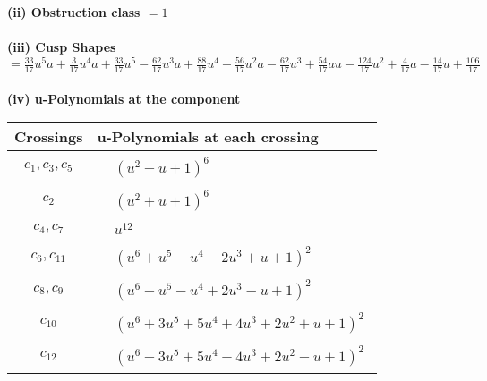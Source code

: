 \documentclass[1p]{elsarticle_modified}
\theoremstyle{definition}
\begin{document}
\flushleft \textbf{(ii) Obstruction class $= 1$}\\~\\
\flushleft \textbf{(iii) Cusp Shapes $= \frac{33}{17} u^5 a+\frac{3}{17} u^4 a+\frac{33}{17} u^5-\frac{62}{17} u^3 a+\frac{88}{17} u^4-\frac{56}{17} u^2 a-\frac{62}{17} u^3+\frac{54}{17} a u-\frac{124}{17} u^2+\frac{4}{17} a-\frac{14}{17} u+\frac{106}{17}$}\\~\\
\newpage\renewcommand{\arraystretch}{1}
\flushleft \textbf{(iv) u-Polynomials at the component}\newline \\
\begin{tabular}{m{50pt}|m{274pt}}
Crossings & \hspace{64pt}u-Polynomials at each crossing \\
\hline $$\begin{aligned}c_{1},c_{3},c_{5}\end{aligned}$$&$\begin{aligned}
&(u^2- u+1)^6
\end{aligned}$\\
\hline $$\begin{aligned}c_{2}\end{aligned}$$&$\begin{aligned}
&(u^2+u+1)^6
\end{aligned}$\\
\hline $$\begin{aligned}c_{4},c_{7}\end{aligned}$$&$\begin{aligned}
&u^{12}
\end{aligned}$\\
\hline $$\begin{aligned}c_{6},c_{11}\end{aligned}$$&$\begin{aligned}
&(u^6+u^5- u^4-2 u^3+u+1)^2
\end{aligned}$\\
\hline $$\begin{aligned}c_{8},c_{9}\end{aligned}$$&$\begin{aligned}
&(u^6- u^5- u^4+2 u^3- u+1)^2
\end{aligned}$\\
\hline $$\begin{aligned}c_{10}\end{aligned}$$&$\begin{aligned}
&(u^6+3 u^5+5 u^4+4 u^3+2 u^2+u+1)^2
\end{aligned}$\\
\hline $$\begin{aligned}c_{12}\end{aligned}$$&$\begin{aligned}
&(u^6-3 u^5+5 u^4-4 u^3+2 u^2- u+1)^2
\end{aligned}$\\
\hline
\end{tabular}\\~\\
\end{document}
